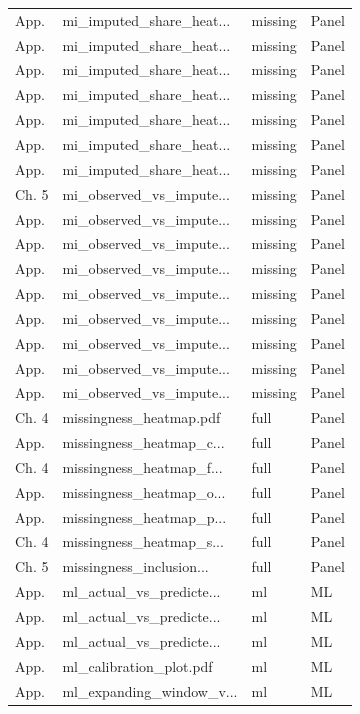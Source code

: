 \begin{longtable}{@{}p{}p{}p{}p{}@{}}
App. & mi\_imputed\_share\_heat... & missing & Panel \\
App. & mi\_imputed\_share\_heat... & missing & Panel \\
App. & mi\_imputed\_share\_heat... & missing & Panel \\
App. & mi\_imputed\_share\_heat... & missing & Panel \\
App. & mi\_imputed\_share\_heat... & missing & Panel \\
App. & mi\_imputed\_share\_heat... & missing & Panel \\
App. & mi\_imputed\_share\_heat... & missing & Panel \\
Ch. 5 & mi\_observed\_vs\_impute... & missing & Panel \\
App. & mi\_observed\_vs\_impute... & missing & Panel \\
App. & mi\_observed\_vs\_impute... & missing & Panel \\
App. & mi\_observed\_vs\_impute... & missing & Panel \\
App. & mi\_observed\_vs\_impute... & missing & Panel \\
App. & mi\_observed\_vs\_impute... & missing & Panel \\
App. & mi\_observed\_vs\_impute... & missing & Panel \\
App. & mi\_observed\_vs\_impute... & missing & Panel \\
App. & mi\_observed\_vs\_impute... & missing & Panel \\
Ch. 4 & missingness\_heatmap.pdf & full & Panel \\
App. & missingness\_heatmap\_c... & full & Panel \\
Ch. 4 & missingness\_heatmap\_f... & full & Panel \\
App. & missingness\_heatmap\_o... & full & Panel \\
App. & missingness\_heatmap\_p... & full & Panel \\
Ch. 4 & missingness\_heatmap\_s... & full & Panel \\
Ch. 5 & missingness\_inclusion... & full & Panel \\
App. & ml\_actual\_vs\_predicte... & ml & ML \\
App. & ml\_actual\_vs\_predicte... & ml & ML \\
App. & ml\_actual\_vs\_predicte... & ml & ML \\
App. & ml\_calibration\_plot.pdf & ml & ML \\
App. & ml\_expanding\_window\_v... & ml & ML \\

\end{longtable}
